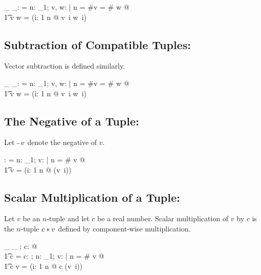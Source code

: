 \documentclass{amsart}
\begin{document}
\begin{axdef}
	\_ \addRinf \_: \RinfDelta \fun \Rinf
\where
	\langle \rangle \addRinf \langle \rangle = \langle \rangle
\also
\forall n: \nat_1; v, w: \Rinf | n = \#v = \# w @ \\
\t1	v \addRinf w = (\lambda i: 1 \upto n @ v~i \addR w~i)
\end{axdef}

\subsection{Subtraction of Compatible Tuples: }

Vector subtraction is defined similarly.

\begin{axdef}
	\_ \subRinf \_: \RinfDelta \fun \Rinf
\where
	\langle \rangle \subRinf \langle \rangle = \langle \rangle
\also
\forall n: \nat_1; v, w: \Rinf | n = \#v = \# w @ \\
\t1	v \subRinf w = (\lambda i: 1 \upto n @ v~i \subR w~i)
\end{axdef}

\subsection{The Negative of a Tuple: }

Let $\operatorname{-} v$ denote the negative of $v$.

\begin{axdef}
\negRinf: \Rinf \fun \Rinf
\where
\negRinf \langle \rangle = \langle \rangle
\also
\forall n: \nat_1; v: \Rinf | n = \# v @ \\
\t1	\negRinf v = (\lambda i: 1 \upto n @ \negR(v~i))
\end{axdef}

\subsection{Scalar Multiplication of a Tuple: }

Let $v$ be an $n$-tuple and let $c$ be a real number.
Scalar multiplication of $v$ by $c$ is the $n$-tuple $c \mathbin{*} v$ defined by component-wise multiplication.

\begin{axdef}
\_ \smulRinf \_ : \R \cross \Rinf \fun \Rinf 
\where
\forall c: \R @ \\
\t1	c \smulRinf \langle \rangle = \langle \rangle
\also
\forall c: \R; n: \nat_1; v: \Rinf | n = \# v @ \\
\t1	c \smulRinf v = (\lambda i: 1 \upto n @ c \mulR (v~i))
\end{axdef}
\end{document}
